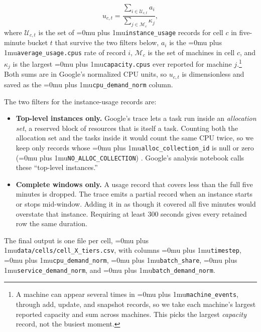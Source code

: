 \documentclass[conference]{IEEEtran}
\newcommand{\codepath}[1]{{\Urlmuskip=0mu plus 1mu\relax\nolinkurl{#1}}}
\begin{document}
\begin{equation}
  u_{c,t}
  =
  \frac{\sum_{i\in\mathcal{U}_{c,t}} a_i}
       {\sum_{j\in\mathcal{M}_c} \kappa_j},
  \label{eq:clusterdata-utilization}
\end{equation}
where \(\mathcal{U}_{c,t}\) is the set of \codepath{instance_usage} records for cell \(c\)
in five-minute bucket \(t\) that survive the two filters below, \(a_i\) is the
\codepath{average_usage.cpus} rate of record \(i\), \(\mathcal{M}_c\) is the set
of machines in cell \(c\), and \(\kappa_j\) is the largest
\codepath{capacity.cpus} ever reported for machine \(j\).\footnote{A machine can appear several times in \codepath{machine_events}, through add, update, and snapshot records, so we take each machine's largest reported capacity and sum across machines. This picks the largest \emph{capacity} record, not the busiest moment.} Both sums are in Google's normalized CPU units, so \(u_{c,t}\) is dimensionless and saved as the \codepath{cpu_demand_norm} column.

The two filters for the instance-usage records are:

\begin{itemize}
  \item \textbf{Top-level instances only.} Google's trace lets a task run         inside an \emph{allocation set}, a reserved block of resources that is         itself a task. Counting both the allocation set and the tasks inside it         would count the same CPU twice, so we keep only records whose \codepath{alloc_collection_id} is null or zero (\codepath{NO_ALLOC_COLLECTION}) \cite{googleTraceFormatV3}. Google's analysis notebook calls these ``top-level instances.''
  \item \textbf{Complete windows only.} A usage record that covers less than the full five minutes is dropped. The trace emits a partial record when an instance starts or stops mid-window. Adding it in as though it covered all five minutes would overstate that instance. Requiring at least 300 seconds gives every retained row the same duration. 
\end{itemize}

The final output is one file per cell, \codepath{data/cells/cell_X_tiers.csv}, with columns \codepath{timestep}, \codepath{cpu_demand_norm}, \codepath{batch_share}, \codepath{service_demand_norm}, and \codepath{batch_demand_norm}.
\end{document}
